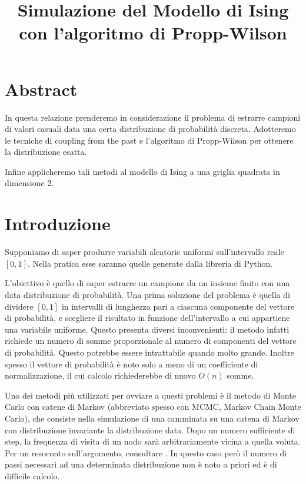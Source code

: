 \documentclass[]{marticle}
\title{\textbf{\huge Simulazione del Modello di Ising con l'algoritmo di
Propp-Wilson}}
\date{}
\begin{document}
\maketitle

\section*{Abstract}
In questa relazione prenderemo in considerazione il problema di estrarre
campioni di valori casuali data una certa distribuzione di probabilit\`a
discreta.  Adotteremo le tecniche di coupling from the past e l'algoritmo di
Propp-Wilson per ottenere la distribuzione esatta.

Infine applicheremo tali metodi al modello di Ising a una griglia quadrata in
dimensione 2.

\section{Introduzione}
Supponiamo di saper produrre variabili aleatorie uniformi sull'intervallo reale
$[0,1]$. Nella pratica esse saranno quelle generate dalla libreria 
di Python.

L'obiettivo \`e quello di saper estrarre un campione da un insieme finito con
una data distribuzione di probabilit\`a.
Una prima soluzione del problema \`e quella di dividere $[0,1]$ in intervalli di
lunghezza pari a ciascuna componente del vettore di probabilit\`a, e scegliere
il risultato in funzione dell'intervallo a cui appartiene una variabile
uniforme. Questo presenta diversi inconvenienti: il metodo infatti richiede un
numero di somme proporzionale al numero di componenti del vettore di
probabilit\`a. Questo potrebbe essere intrattabile quando molto grande. Inoltre
spesso il vettore di probabilit\`a \`e noto solo a meno di un coefficiente di
normalizzazione, il cui calcolo richiederebbe di nuovo $O(n)$ somme. 

Uno dei metodi pi\`u utilizzati per ovviare a questi problemi \`e il metodo di
Monte Carlo con catene di Markov (abbreviato spesso con MCMC, Markov Chain Monte
Carlo), che consiste nella simulazione di una camminata su una catena di Markov
con distribuzione invariante la distribuzione data. Dopo un numero sufficiente
di step, la frequenza di visita di un nodo sar\`a arbitrariamente vicina a
quella voluta. Per un resoconto sull'argomento, consultare \cite{bremaud}.
In questo caso per\`o il numero di passi necessari ad una
determinata distribuzione non \`e noto a priori ed \`e di difficile calcolo.
\end{document}
